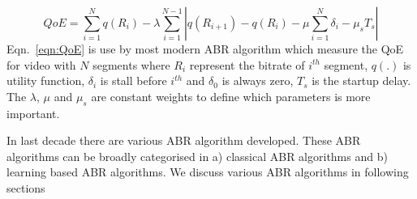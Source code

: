 \begin{equation}
	\label{eqn:QoE}
	QoE = \sum_{i=1}^N q(R_i) - \lambda\sum_{i=1}^{N-1}\left|q(R_{i+1})-q(R_i) - \mu\sum_{i=1}^N \delta_i - \mu_s T_s\right|
\end{equation}
Eqn.~\ref{eqn:QoE} is use by most modern ABR algorithm which measure the QoE for video with $N$ segments where $R_i$ represent the bitrate of $i^{th}$ segment, $q(.)$ is utility function, $\delta_i$ is stall before $i^{th}$ and $\delta_0$ is always zero, $T_s$ is the startup delay. The $\lambda$, $\mu$ and $\mu_s$ are constant weights to define which parameters is more important.

In last decade there are various ABR algorithm developed. These ABR algorithms can be broadly categorised in a) classical ABR algorithms and b) learning based ABR algorithms. We discuss various ABR algorithms in following sections

%
%
